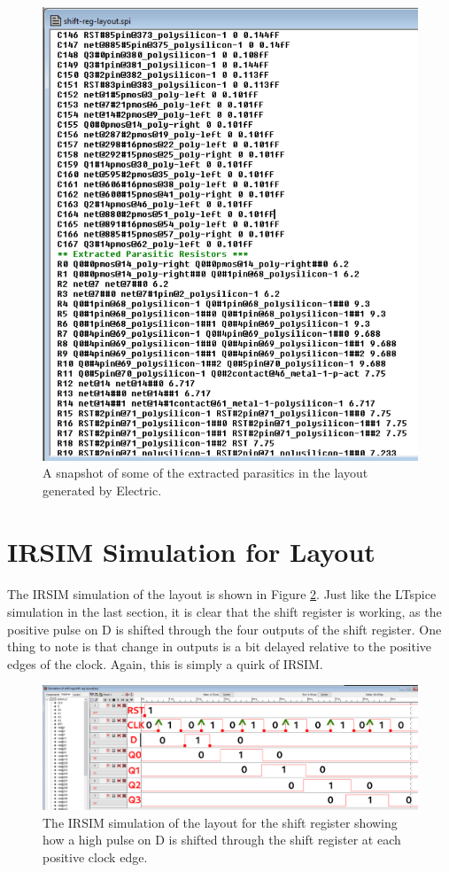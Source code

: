 \documentclass{article}
\begin{document}
  \begin{figure}[H]
    \centering
    \includegraphics[width=0.5\linewidth, frame]{screenshots/extraction.png}
    \caption{A snapshot of some of the extracted parasitics in the layout generated by Electric.}
    \label{fig:extraction}
  \end{figure}






\section{IRSIM Simulation for Layout}
  \paragraph{}
  The IRSIM simulation of the layout is shown in Figure \ref{fig:lay-irsim}. Just like the LTspice simulation in the last section, it is clear that the shift register is working, as the positive pulse on D is shifted through the four outputs of the shift register. One thing to note is that change in outputs is a bit delayed relative to the positive edges of the clock. Again, this is simply a quirk of IRSIM.



  \begin{figure}[H]
    \centering
    \includegraphics[width=\linewidth, frame]{screenshots/lay-irsim.png}
    \caption{The IRSIM simulation of the layout for the shift register showing how a high pulse on D is shifted through the shift register at each positive clock edge.}
    \label{fig:lay-irsim}
  \end{figure}
\end{document}
